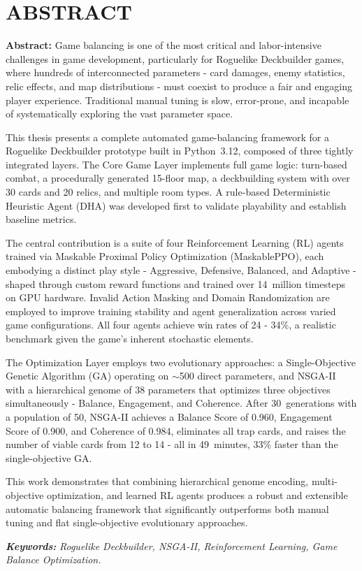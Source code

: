 ﻿\clearpage
{}
{}
\chapter*{ABSTRACT}

\vspace{0.5cm}

\noindent\textbf{Abstract:} Game balancing is one of the most critical and labor-intensive challenges in game development, particularly for Roguelike Deckbuilder games, where hundreds of interconnected parameters - card damages, enemy statistics, relic effects, and map distributions - must coexist to produce a fair and engaging player experience. Traditional manual tuning is slow, error-prone, and incapable of systematically exploring the vast parameter space.

This thesis presents a complete automated game-balancing framework for a Roguelike Deckbuilder prototype built in Python~3.12, composed of three tightly integrated layers. The Core Game Layer implements full game logic: turn-based combat, a procedurally generated 15-floor map, a deckbuilding system with over 30 cards and 20 relics, and multiple room types. A rule-based Deterministic Heuristic Agent (DHA) was developed first to validate playability and establish baseline metrics.

The central contribution is a suite of four Reinforcement Learning (RL) agents trained via Maskable Proximal Policy Optimization (MaskablePPO), each embodying a distinct play style - Aggressive, Defensive, Balanced, and Adaptive - shaped through custom reward functions and trained over 14~million timesteps on GPU hardware. Invalid Action Masking and Domain Randomization are employed to improve training stability and agent generalization across varied game configurations. All four agents achieve win rates of 24 - 34\%, a realistic benchmark given the game's inherent stochastic elements.

The Optimization Layer employs two evolutionary approaches: a Single-Objective Genetic Algorithm (GA) operating on $\sim$500 direct parameters, and NSGA-II with a hierarchical genome of 38 parameters that optimizes three objectives simultaneously - Balance, Engagement, and Coherence. After 30~generations with a population of 50, NSGA-II achieves a Balance Score of 0.960, Engagement Score of 0.900, and Coherence of 0.984, eliminates all trap cards, and raises the number of viable cards from 12 to 14 - all in 49~minutes, 33\% faster than the single-objective GA.

This work demonstrates that combining hierarchical genome encoding, multi-objective optimization, and learned RL agents produces a robust and extensible automatic balancing framework that significantly outperforms both manual tuning and flat single-objective evolutionary approaches.

\vspace{0.5cm}
\noindent\textit{\textbf{Keywords:}} \textit{Roguelike Deckbuilder, NSGA-II, Reinforcement Learning, Game Balance Optimization.}
